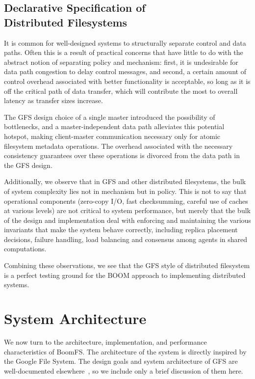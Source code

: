 \documentclass{article}
\begin{document}
\subsection{Declarative Specification of\\Distributed Filesystems}
It is common for well-designed systems to structurally separate control and data paths.  Often this is a result of practical concerns that have little to do with the abstract notion of separating policy and mechanism: first, it is undesirable for data path congestion to delay control messages, and second, a certain amount of control overhead associated with better functionality is acceptable, so long as it is off the critical path of data transfer, which will contribute the most to overall latency as transfer sizes increase.  

The GFS design choice of a single master introduced the possibility of bottlenecks, and a master-independent data path alleviates this potential hotspot, making client-master communication necessary only for atomic filesystem metadata operations.   The overhead associated with the necessary consistency guarantees over these operations is divorced from the data path in the GFS design.

Additionally, we observe that in GFS and other distributed filesystems, the bulk of system complexity lies not in mechanism but in policy.  This is not to say that operational components (zero-copy I/O, fast checksumming, careful use of caches at various levels) are not critical to system performance, but merely that the bulk of the design and implementation deal with enforcing and maintaining the various invariants that make the system behave correctly, including replica placement decisions, failure handling, load balancing and consensus among agents in shared computations.

Combining these observations, we see that the GFS style of distributed filesystem is a perfect testing ground for the BOOM approach to implementing distributed systems.


\section{System Architecture}
\label{system-arch}
We now turn to the architecture, implementation, and performance
characteristics of BoomFS. The architecture of the system is directly
inspired by the Google File System. The design goals and system
architecture of GFS are well-documented elsewhere~\cite{gfs,
  hdfs-arch}, so we include only a brief discussion of them here.
\end{document}
